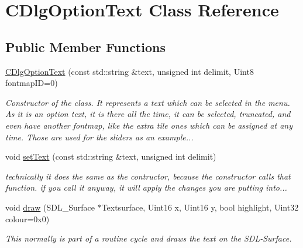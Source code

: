 \hypertarget{class_c_dlg_option_text}{
\section{CDlgOptionText Class Reference}
\label{class_c_dlg_option_text}
}
\subsection*{Public Member Functions}
\begin{DoxyCompactItemize}
\item 
\hyperlink{class_c_dlg_option_text_a6aa84e8218734348752d23b0d75a9da4}{CDlgOptionText} (const std::string \&text, unsigned int delimit, Uint8 fontmapID=0)
\begin{DoxyCompactList}\small\item\em Constructor of the class. It represents a text which can be selected in the menu. As it is an option text, it is there all the time, it can be selected, truncated, and even have another fontmap, like the extra tile ones which can be assigned at any time. Those are used for the sliders as an example... \item\end{DoxyCompactList}\item 
void \hyperlink{class_c_dlg_option_text_aaa35c07e33b5555aa99b1d24ef9bb629}{setText} (const std::string \&text, unsigned int delimit)
\begin{DoxyCompactList}\small\item\em technically it does the same as the contructor, because the constructor calls that function. if you call it anyway, it will apply the changes you are putting into... \item\end{DoxyCompactList}\item 
void \hyperlink{class_c_dlg_option_text_a098be3cab83afc259f05590bd894368a}{draw} (SDL\_\-Surface $\ast$Textsurface, Uint16 x, Uint16 y, bool highlight, Uint32 colour=0x0)
\begin{DoxyCompactList}\small\item\em This normally is part of a routine cycle and draws the text on the SDL-\/Surface. \item\end{DoxyCompactList}\end{DoxyCompactItemize}
